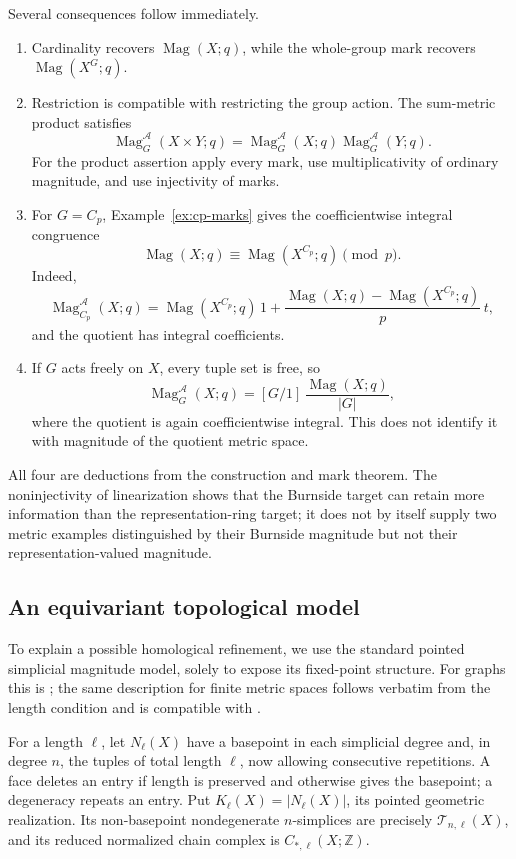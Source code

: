 \documentclass[11pt,a4paper]{article}
\numberwithin{equation}{section}
\theoremstyle{definition}
\theoremstyle{remark}
\newcommand{\Z}{\mathbb Z}
\newcommand{\G}{G}
\newcommand{\Mag}{\operatorname{Mag}}
\newcommand{\Burn}{\mathcal A}
\begin{document}
Several consequences follow immediately.
\begin{enumerate}[label=(\roman*)]
\item Cardinality recovers $\Mag(X;q)$, while the whole-group mark
recovers $\Mag(X^\G;q)$.
\item Restriction is compatible with restricting the group action.
The sum-metric product satisfies
\[
 \Mag^{\Burn}_\G(X\times Y;q)
  =\Mag^{\Burn}_\G(X;q)\Mag^{\Burn}_\G(Y;q).
\]
For the product assertion apply every mark, use multiplicativity of
ordinary magnitude, and use injectivity of marks.
\item For $\G=C_p$, Example~\ref{ex:cp-marks} gives the coefficientwise
integral congruence
\begin{equation}\label{eq:cp-congruence}
 \Mag(X;q)\equiv\Mag(X^{C_p};q)\pmod p.
\end{equation}
Indeed,
\[
 \Mag^{\Burn}_{C_p}(X;q)
 =\Mag(X^{C_p};q)\,1+
   \frac{\Mag(X;q)-\Mag(X^{C_p};q)}p\,t,
\]
and the quotient has integral coefficients.
\item If $\G$ acts freely on $X$, every tuple set is free, so
\[
 \Mag^{\Burn}_\G(X;q)=
       [\G/1]\,\frac{\Mag(X;q)}{|\G|},
\]
where the quotient is again coefficientwise integral.  This does not
identify it with magnitude of the quotient metric space.
\end{enumerate}
All four are deductions from the construction and mark theorem.
The noninjectivity of linearization shows that the Burnside target
can retain more information than the representation-ring target;
it does not by itself supply two metric examples distinguished by
their Burnside magnitude but not their representation-valued magnitude.

\subsection{An equivariant topological model}
\label{subsec:nerve}

To explain a possible homological refinement, we use the standard
pointed simplicial magnitude model, solely to expose its fixed-point
structure.  For graphs this is \cite[Definition 40 and Lemma 42]{HW};
the same description for finite metric spaces follows verbatim from
the length condition and is compatible with \cite{LS}.

For a length $\ell$, let $N_\ell(X)$ have a basepoint in each
simplicial degree and, in degree $n$, the tuples of total length
$\ell$, now allowing consecutive repetitions.  A face deletes an
entry if length is preserved and otherwise gives the basepoint;
a degeneracy repeats an entry.  Put
$K_\ell(X)=|N_\ell(X)|$, its pointed geometric realization.
Its non-basepoint nondegenerate $n$-simplices are precisely
$\mathcal T_{n,\ell}(X)$, and its reduced normalized chain complex is
$C_{*,\ell}(X;\Z)$.
\end{document}
